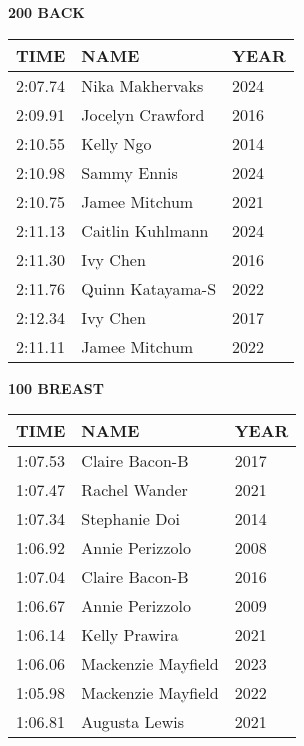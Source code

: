 \begin{minipage}[t]{0.48\textwidth}
\centering
\textbf{200 BACK}\\[0.05cm]
\begin{tabular}{@{}p{1.8cm}p{2.8cm}p{1.2cm}@{}}
\hline
\textbf{TIME} & \textbf{NAME} & \textbf{YEAR} \\
\hline
2:07.74 & Nika Makhervaks & 2024 \\
2:09.91 & Jocelyn Crawford & 2016 \\
2:10.55 & Kelly Ngo & 2014 \\
2:10.98 & Sammy Ennis & 2024 \\
2:10.75 & Jamee Mitchum & 2021 \\
2:11.13 & Caitlin Kuhlmann & 2024 \\
2:11.30 & Ivy Chen & 2016 \\
2:11.76 & Quinn Katayama-S & 2022 \\
2:12.34 & Ivy Chen & 2017 \\
2:11.11 & Jamee Mitchum & 2022 \\
\hline
\end{tabular}
\end{minipage}\hfill
\begin{minipage}[t]{0.48\textwidth}
\centering
\textbf{100 BREAST}\\[0.05cm]
\begin{tabular}{@{}p{1.8cm}p{2.8cm}p{1.2cm}@{}}
\hline
\textbf{TIME} & \textbf{NAME} & \textbf{YEAR} \\
\hline
1:07.53 & Claire Bacon-B & 2017 \\
1:07.47 & Rachel Wander & 2021 \\
1:07.34 & Stephanie Doi & 2014 \\
1:06.92 & Annie Perizzolo & 2008 \\
1:07.04 & Claire Bacon-B & 2016 \\
1:06.67 & Annie Perizzolo & 2009 \\
1:06.14 & Kelly Prawira & 2021 \\
1:06.06 & Mackenzie Mayfield & 2023 \\
1:05.98 & Mackenzie Mayfield & 2022 \\
1:06.81 & Augusta Lewis & 2021 \\
\hline
\end{tabular}
\end{minipage}

\vspace{0.4cm}

